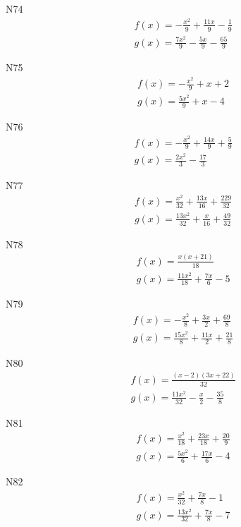 \documentclass[11pt]{report}
\begin{document}
N74
\begin{align*}
 f(x) = - \frac{x^{2}}{9} + \frac{11 x}{9} - \frac{1}{9}\\
 g(x) = \frac{7 x^{2}}{9} - \frac{5 x}{9} - \frac{65}{9}
\end{align*}

N75
\begin{align*}
 f(x) = - \frac{x^{2}}{9} + x + 2\\
 g(x) = \frac{5 x^{2}}{9} + x - 4
\end{align*}

N76
\begin{align*}
 f(x) = - \frac{x^{2}}{9} + \frac{14 x}{9} + \frac{5}{9}\\
 g(x) = \frac{2 x^{2}}{3} - \frac{17}{3}
\end{align*}

N77
\begin{align*}
 f(x) = \frac{x^{2}}{32} + \frac{13 x}{16} + \frac{229}{32}\\
 g(x) = \frac{13 x^{2}}{32} + \frac{x}{16} + \frac{49}{32}
\end{align*}

N78
\begin{align*}
 f(x) = \frac{x \left(x + 21\right)}{18}\\
 g(x) = \frac{11 x^{2}}{18} + \frac{7 x}{6} - 5
\end{align*}

N79
\begin{align*}
 f(x) = - \frac{x^{2}}{8} + \frac{3 x}{2} + \frac{69}{8}\\
 g(x) = \frac{15 x^{2}}{8} + \frac{11 x}{2} + \frac{21}{8}
\end{align*}

N80
\begin{align*}
 f(x) = \frac{\left(x - 2\right) \left(3 x + 22\right)}{32}\\
 g(x) = \frac{11 x^{2}}{32} - \frac{x}{2} - \frac{35}{8}
\end{align*}

N81
\begin{align*}
 f(x) = \frac{x^{2}}{18} + \frac{23 x}{18} + \frac{20}{9}\\
 g(x) = \frac{5 x^{2}}{6} + \frac{17 x}{6} - 4
\end{align*}

N82
\begin{align*}
 f(x) = \frac{x^{2}}{32} + \frac{7 x}{8} - 1\\
 g(x) = \frac{13 x^{2}}{32} + \frac{7 x}{8} - 7
\end{align*}
\end{document}
